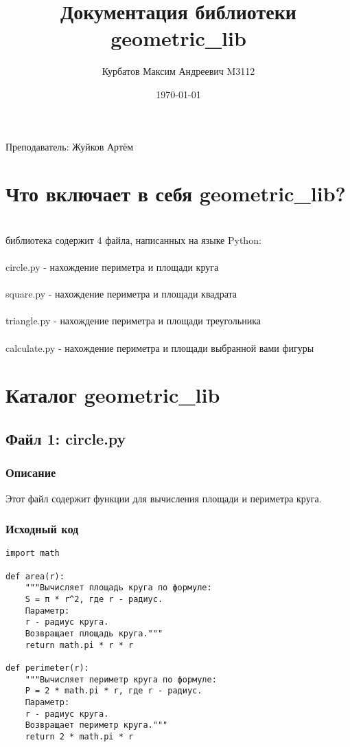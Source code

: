 \documentclass{article}
\title{Документация библиотеки geometric\_lib}
\author{Курбатов Максим Андреевич M3112}
\date{\today}
\begin{document}
\maketitle
\begin{center}
\large Преподаватель: Жуйков Артём\\
\end{center}

\newpage

\tableofcontents
\newpage
\section{Что включает в себя geometric_lib?}
\\
 библиотека содержит 4 файла, написанных на языке Python:\\
\\
\large circle.py - нахождение периметра и площади круга\\
\\
\large square.py - нахождение периметра и площади квадрата\\
\\
\large triangle.py - нахождение периметра и площади треугольника\\
\\
\large calculate.py - нахождение периметра и площади выбранной вами фигуры\\

\section{Каталог geometric_lib}

\subsection{Файл 1: circle.py}
\subsubsection{Описание}
Этот файл содержит функции для вычисления площади и периметра круга.

\subsubsection{Исходный код}
\begin{verbatim}
import math

def area(r):
    """Вычисляет площадь круга по формуле: 
    S = π * r^2, где r - радиус.
    Параметр:
    r - радиус круга.
    Возвращает площадь круга."""
    return math.pi * r * r

def perimeter(r):
    """Вычисляет периметр круга по формуле: 
    P = 2 * math.pi * r, где r - радиус.
    Параметр:
    r - радиус круга.
    Возвращает периметр круга."""
    return 2 * math.pi * r
\end{verbatim}
\end{document}
